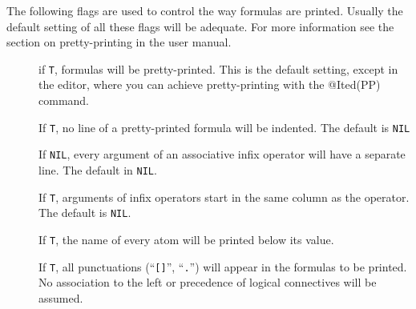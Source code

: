 The following flags are used to control the way formulas are printed.  Usually
the default setting of all these flags will be adequate.  For more information
see the section on pretty-printing in the \TPS user manual.

\begin{description}
\item [] if {\tt T}, formulas will be pretty-printed.  This is
the default setting, except in the editor, where you can achieve pretty-printing
with the @Ited(PP) command.

\item [] 
If {\tt T}, no line of a pretty-printed formula will be indented.  The default
is {\tt NIL}

\item [] 
If {\tt NIL}, every argument of an associative infix operator will have a
separate line.  The default in {\tt NIL}.

\item [] 
If {\tt T}, arguments of infix operators start in the same column as
the operator.  The default is {\tt NIL}.

\item [] 
If {\tt T}, the name of every atom will be printed below its value.

\item [] 
If {\tt T}, all punctuations (``{\tt []}'', ``{\tt .}'') will appear in the formulas
to be printed.  No association to the left or precedence of logical
connectives will be assumed.
\end{description}
